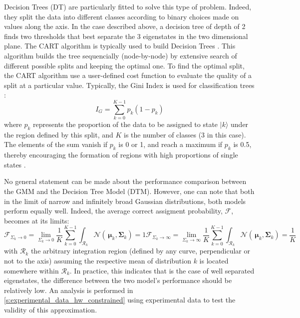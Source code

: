 Decision Trees (DT) are particularly fitted to solve this type of problem. Indeed, they split the data into different classes according to binary choices made on values along the axis. In the case described above, a decision tree of depth of 2 finds two thresholds that best separate the 3 eigenstates in the two dimensional plane. The CART algorithm is typically used to build Decision Trees \cite{Breiman1984}. This algorithm builds the tree sequencially (node-by-node) by extensive search of different possible splits and keeping the optimal one. To find the optimal split, the CART algorithm use a user-defined cost function to evaluate the quality of a split at a particular value. Typically, the Gini Index is used for classification trees \cite{Bishop2006, Breiman1984}:
\begin{equation}
   I_G = \sum_{k=0}^{K-1} p_{k}\left(1-p_{k}\right)
\end{equation}
where $p_k$ represents the proportion of the data to be assigned to state $|k\rangle$ under the region defined by this split, and $K$ is the number of classes (3 in this case). The elements of the sum vanish if $p_k$ is 0 or 1, and reach a maximum if $p_k$ is 0.5, thereby encouraging the formation of regions with high proportions of single states \cite[p.~666]{Bishop2006}. 

No general statement can be made about the performance comparison between the GMM and the Decision Tree Model (DTM). However, one can note that both in the limit of narrow and infinitely broad Gaussian distributions, both models perform equally well. Indeed, the average correct assigment probability, $\mathcal{F}$, becomes at its limits:
\begin{subequations}
\begin{equation}  \label{eq:opt_vs_thr_lim_0}
    \mathcal{F}_{\Sigma_k \xrightarrow{} 0} = \lim_{\Sigma_k \xrightarrow{} 0} \frac{1}{K}\sum_{k=0}^{K-1}\int_{\mathcal{R}_k} \mathcal{N}(\,\boldsymbol{\mu}_{k}, \mathbf{\Sigma}_{k}) = 1
\end{equation}
\begin{equation} \label{eq:opt_vs_thr_lim_inf}
    \mathcal{F}_{\Sigma_k \xrightarrow{} \infty} = \lim_{\Sigma_k \xrightarrow{} \infty} \frac{1}{K}\sum_{k=0}^{K-1}\int_{\mathcal{R}_k} \mathcal{N}( \,\boldsymbol{\mu}_{k}, \mathbf{\Sigma}_{k}) = \frac{1}{K}
\end{equation}

\end{subequations}
with $\mathcal{R}_k$ the arbitrary integration region (defined by any curve, perpendicular or not to the axis) assuming the respective mean of distribution $k$ is located somewhere within $\mathcal{R}_k$. In practice, this indicates that is the case of well separated eigenstates, the difference between the two model's performance should be relatively low. An analysis is performed in  \ref{s:experimental_data_hw_constrained} using experimental data to test the validity of this approximation.